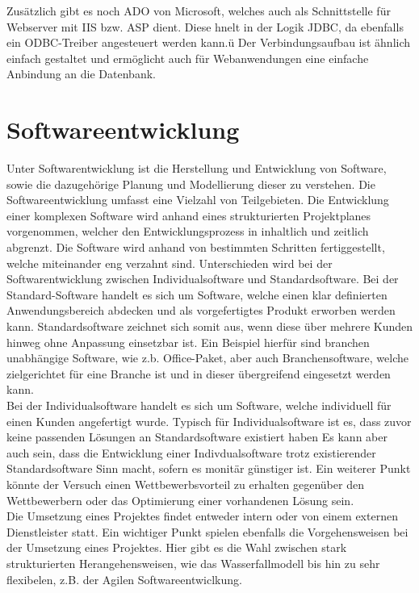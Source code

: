 Zusätzlich gibt es noch ADO von Microsoft, welches auch als Schnittstelle für Webserver mit IIS bzw. ASP dient.
Diese hnelt in der Logik JDBC, da ebenfalls ein ODBC-Treiber angesteuert werden kann.ü
Der Verbindungsaufbau ist ähnlich einfach gestaltet und ermöglicht auch für Webanwendungen eine einfache Anbindung an die Datenbank.

\section{Softwareentwicklung}
\label{sec:softdev}

Unter Softwarentwicklung ist die Herstellung und Entwicklung von Software, sowie die dazugehörige Planung und Modellierung dieser zu verstehen. Die Softwareentwicklung umfasst eine Vielzahl von Teilgebieten. Die Entwicklung einer komplexen Software wird anhand eines strukturierten Projektplanes vorgenommen, welcher den Entwicklungsprozess in inhaltlich und zeitlich abgrenzt. Die Software wird anhand von bestimmten Schritten fertiggestellt, welche miteinander eng verzahnt sind. Unterschieden wird bei der Softwarentwicklung zwischen Individualsoftware und Standardsoftware. Bei der Standard-Software handelt es sich um Software, welche einen klar definierten Anwendungsbereich abdecken und als vorgefertigtes Produkt erworben werden kann. Standardsoftware zeichnet sich somit aus, wenn diese über mehrere Kunden hinweg ohne Anpassung einsetzbar ist. Ein Beispiel hierfür sind branchen unabhängige Software, wie z.b. Office-Paket, aber auch Branchensoftware, welche zielgerichtet für eine Branche ist und in dieser übergreifend eingesetzt werden kann.\\
Bei der Individualsoftware handelt es sich um Software, welche individuell für einen Kunden angefertigt wurde. Typisch für Individualsoftware ist es, dass zuvor keine passenden Lösungen an Standardsoftware existiert haben  Es kann aber auch sein, dass die Entwicklung einer Indivdualsoftware trotz existierender Standardsoftware Sinn macht, sofern es monitär günstiger ist. Ein weiterer Punkt  könnte der Versuch einen Wettbewerbsvorteil zu erhalten gegenüber den Wettbewerbern oder das Optimierung einer vorhandenen Lösung sein.\\
Die Umsetzung eines Projektes findet entweder intern oder von einem externen Dienstleister statt. Ein wichtiger Punkt spielen ebenfalls die Vorgehensweisen bei der Umsetzung eines Projektes. Hier gibt es die Wahl zwischen stark strukturierten Herangehensweisen, wie das Wasserfallmodell bis hin zu sehr flexibelen, z.B. der Agilen Softwareentwiclkung.\\
